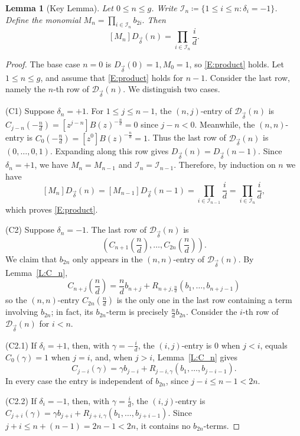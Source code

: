 \documentclass{amsart}
\theoremstyle{plain}
\newtheorem{lemma}[theorem]{Lemma}
\theoremstyle{remark}
\newcommand{\cI}{\mathcal{I}}
\newcommand{\cD}{\mathcal{D}}
\newcommand{\1}{\mathbf{1}}
\newcommand{\bdelta}{{\vec\delta}}
\begin{document}
\begin{lemma}[Key Lemma]\label{L:M_n}
Let $0\le n\le g$.
Write $\cI_n\coloneqq \{1\le i\le n: \delta_i=-1\}$.
Define the monomial
$
M_n=\prod_{i\in \cI_n}b_{2i}.
$
Then
\begin{equation}
\label{E:product}
[M_n]D_\bdelta(n)
= \prod_{i\in\cI_n} \frac{i}{d}.
\end{equation}
\end{lemma}
\begin{proof}
The base case $n=0$ is $D_\bdelta(0)=1, M_0=1$, so \eqref{E:product} holds.
Let $1\le n\le g$, and assume that \eqref{E:product}
holds for $n-1$. Consider the last row, namely
the $n$-th row of $\cD_\bdelta(n)$.
We distinguish two cases.

(C1) Suppose $\delta_n=+1$.
For $1\le j\le n-1$,
the $(n,j)$-entry of $\cD_\bdelta(n)$ is
$C_{j-n}(-\frac{n}{d})=[z^{j-n}]B(z)^{-\frac{n}{d}}=0$
since $j-n<0$. Meanwhile,
the $(n,n)$-entry is
$C_0(-\frac{n}{d})=[z^0]B(z)^{-\frac{n}{d}}=1$.
Thus the last row of $\cD_\bdelta(n)$ is
$(0,\ldots,0,1)$.
Expanding along this row gives
$
D_\bdelta(n)=D_\bdelta(n-1).
$
Since $\delta_n=+1$, we have $M_n=M_{n-1}$ and $\cI_n=\cI_{n-1}$.
Therefore, by induction on $n$ we have
\[
[M_n]D_\bdelta(n)=[M_{n-1}]D_\bdelta(n-1)=\prod_{i\in \cI_{n-1}}\frac{i}{d}=\prod_{i\in \cI_n}\frac{i}{d},
\]
which proves \eqref{E:product}.

(C2) Suppose $\delta_n=-1$. The last row of $\cD_\bdelta(n)$ is
\[
\left(C_{n+1}(\frac{n}{d}),
\ldots, C_{2n}(\frac{n}{d})\right).
\]
We claim that $b_{2n}$ only appears in the $(n,n)$-entry of $\cD_\bdelta(n)$.
By Lemma~\ref{L:C_n},
\[
C_{n+j}\left(\frac{n}{d}\right)=\frac{n}{d}b_{n+j}+R_{n+j,\frac{n}{d}}(b_1,\ldots,b_{n+j-1})
\]
so the $(n,n)$-entry $C_{2n}(\frac{n}{d})$ is the only one
in the last row containing a term involving $b_{2n}$; in fact,
its $b_{2n}$-term is precisely $\frac{n}{d}b_{2n}$.
Consider the $i$-th row of $\cD_{\bdelta}(n)$ for $i<n$.

(C2.1) If $\delta_i=+1$, then, with $\gamma=-\frac{i}{d}$,
the $(i,j)$-entry
is $0$ when $j<i$, equals $C_0(\gamma)=1$ when $j=i$, and, when
$j>i$, Lemma~\ref{L:C_n} gives
\[
C_{j-i}(\gamma)=
\gamma b_{j-i}
+
R_{j-i,\gamma}(b_1,\ldots,b_{j-i-1}).
\]
In every case the entry is independent of $b_{2n}$, since
$j-i\le n-1<2n$.

(C2.2)
If $\delta_i=-1$, then, with $\gamma=\frac{i}{d}$,
the $(i,j)$-entry is
$
C_{j+i}(\gamma)=\gamma b_{j+i}+R_{j+i,\gamma}(b_1,\ldots,b_{j+i-1}).
$
Since $j+i\le n+(n-1)=2n-1<2n$, it contains no $b_{2n}$-terms.


\end{proof}
\end{document}
